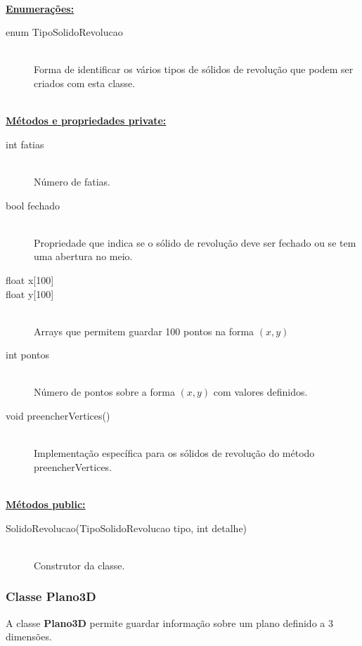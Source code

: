 \documentclass[a5paper,onecolumn, 11pt]{article}
\begin{document}
\hfill \\ \underline{\textbf{Enumerações:}}

\begin{description}
	\item[enum TipoSolidoRevolucao] \hfill \\
	Forma de identificar os vários tipos de sólidos de revolução que podem ser criados com esta classe.
\end{description}

\hfill \\ \underline{\textbf{Métodos e propriedades private:}}

\begin{description}
	\item[int fatias] \hfill \\
	Número de fatias.

	\item[bool fechado] \hfill \\
	Propriedade que indica se o sólido de revolução deve ser fechado ou se tem uma abertura no meio.

	\item[float x{[100]}]
	\item[float y{[100]}]\hfill \\
	Arrays que permitem guardar 100 pontos na forma $(x,y)$

	\item[int pontos] \hfill \\
	Número de pontos sobre a forma $(x,y)$ com valores definidos.

	\item[void preencherVertices()] \hfill \\
	Implementação específica para os sólidos de revolução do método preencherVertices.
\end{description}

\hfill \\ \underline{\textbf{Métodos public:}}

\begin{description}
	\item[SolidoRevolucao(TipoSolidoRevolucao tipo, int detalhe)] \hfill \\
	Construtor da classe.
\end{description}

\clearpage
\subsubsection{Classe Plano3D} \label{classe plano3d}
A classe \textbf{Plano3D} permite guardar informação sobre um plano definido a 3 dimensões.
\end{document}

